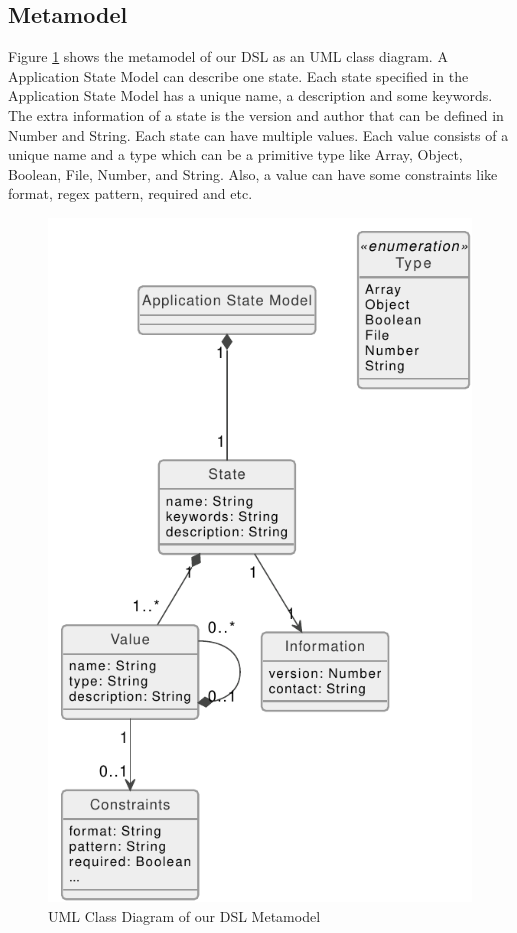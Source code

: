 \subsection{Metamodel}
Figure \ref{fig:asml-meta-model} shows the metamodel of our DSL as an UML class diagram. A Application State Model can describe one state. Each state specified in the Application State Model has a unique name, a description and some keywords. The extra information of a state is the version and author that can be defined in Number and String. Each state can have multiple values. Each value consists of a unique name and a type which can be a primitive type like Array, Object, Boolean, File, Number, and String. Also, a value can have some constraints like format, regex pattern, required and etc.

\FloatBarrier
\begin{figure}
    \includegraphics[scale=1]{../figures/asml-class-diagram.pdf}
    \centering
    \caption{UML Class Diagram of our DSL Metamodel}
    \label{fig:asml-meta-model}
\end{figure}
\FloatBarrier

